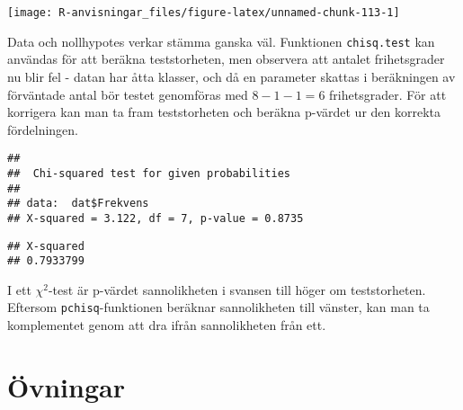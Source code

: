 \documentclass[
]{book}
\newenvironment{Shaded}{\begin{snugshade}}{\end{snugshade}}
\newcommand{\AttributeTok}[1]{\textcolor[rgb]{0.77,0.63,0.00}{#1}}
\newcommand{\DecValTok}[1]{\textcolor[rgb]{0.00,0.00,0.81}{#1}}
\newcommand{\FunctionTok}[1]{\textcolor[rgb]{0.00,0.00,0.00}{#1}}
\newcommand{\NormalTok}[1]{#1}
\newcommand{\OtherTok}[1]{\textcolor[rgb]{0.56,0.35,0.01}{#1}}
\newcommand{\SpecialCharTok}[1]{\textcolor[rgb]{0.00,0.00,0.00}{#1}}
\theoremstyle{definition}
\theoremstyle{definition}
\theoremstyle{definition}
\theoremstyle{definition}
\theoremstyle{remark}
\begin{document}
\begin{center}\texttt{[image: R-anvisningar\_files/figure-latex/unnamed-chunk-113-1]} \end{center}

Data och nollhypotes verkar stämma ganska väl. Funktionen \texttt{chisq.test} kan användas för att beräkna teststorheten, men observera att antalet frihetsgrader nu blir fel - datan har åtta klasser, och då en parameter skattas i beräkningen av förväntade antal bör testet genomföras med \(8-1-1=6\) frihetsgrader. För att korrigera kan man ta fram teststorheten och beräkna p-värdet ur den korrekta fördelningen.

\begin{Shaded}
\end{Shaded}

\begin{verbatim}
## 
##  Chi-squared test for given probabilities
## 
## data:  dat$Frekvens
## X-squared = 3.122, df = 7, p-value = 0.8735
\end{verbatim}

\begin{Shaded}
\end{Shaded}

\begin{verbatim}
## X-squared 
## 0.7933799
\end{verbatim}

I ett \(\chi^2\)-test är p-värdet sannolikheten i svansen till höger om teststorheten. Eftersom \texttt{pchisq}-funktionen beräknar sannolikheten till vänster, kan man ta komplementet genom att dra ifrån sannolikheten från ett.

\hypertarget{uxf6vningar-2}{%
\section{Övningar}\label{uxf6vningar-2}}
\end{document}
